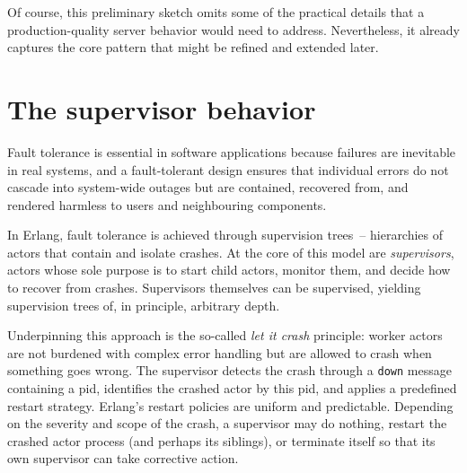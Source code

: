 
Of course, this preliminary sketch omits some of the practical details that a production-quality server behavior would need to address. Nevertheless, it already captures the core pattern that might be refined and extended later.

\section{The supervisor behavior}

Fault tolerance is essential in software applications because failures are
inevitable in real systems, and a fault-tolerant design ensures that
individual errors do not cascade into system-wide outages but are
contained, recovered from, and rendered harmless to users and neighbouring
components.

In Erlang, fault tolerance is achieved through supervision trees~--
hierarchies of actors that contain and isolate crashes. At the core of this
model are \emph{supervisors}, actors whose sole purpose is to start child
actors, monitor them, and decide how to recover from crashes. Supervisors
themselves can be supervised, yielding supervision trees of, in principle,
arbitrary depth.

Underpinning this approach is the so-called \emph{let it crash} principle:
worker actors are not burdened with complex error handling but are allowed
to crash when something goes wrong. The supervisor detects the crash
through a \texttt{down} message containing a pid, identifies the crashed
actor by this pid, and applies a predefined restart strategy. Erlang's
restart policies are uniform and predictable. Depending on the severity and
scope of the crash, a supervisor may do nothing, restart the crashed actor
process (and perhaps its siblings), or terminate itself so that its own
supervisor can take corrective action.

